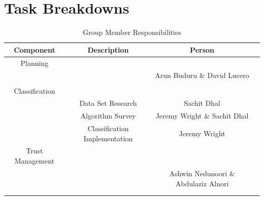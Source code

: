 \FloatBarrier
\section{Task Breakdowns}

\begin{table}[h!]
    \centering
    \begin{tabular}{c | c | c | c}
        \hline
        Component	    &  Description   & Person \\
        \hline \hline
        Planning        &  &   \\
                        &  &   Arun Buduru \& David Lucero\\
                        &  &   \\
        Classification  &  &   \\
                        &  Data Set Research    &   Sachit Dhal\\
                        &  Algorithm Survey     &   Jeremy Wright \& Sachit Dhal\\
                        &  Classification Implementation &  Jeremy Wright \\
        Trust Management&  &   \\
                        &  &   Ashwin Nedunoori \& Abdulaziz Alnori\\
                        &  &   \\
                        &  &   \\
    \end{tabular}
    \caption{Group Member Responsibilities}
\end{table}
